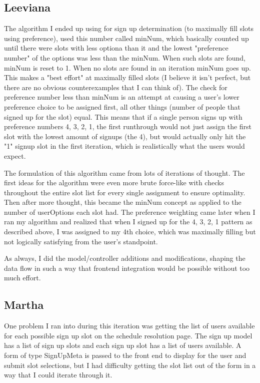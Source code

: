 \documentclass{article}
\begin{document}
\subsection{Leeviana}
The algorithm I ended up using for sign up determination (to maximally fill slots using preference), used this number called minNum, which basically counted up until there were slots with less optiona than it and the lowest "preference number" of the options was less than the minNum. When such slots are found, minNum is reset to 1. When no slots are found in an iteration minNum goes up. This makes a "best effort" at maximally filled slots (I believe it isn't perfect, but there are no obvious counterexamples that I can think of). The check for preference number less than minNum is an attempt at causing a user's lower preference choice to be assigned first, all other things (number of people that signed up for the slot) equal. This means that if a single person signs up with preference numbers 4, 3, 2, 1, the first runthrough would not just assign the first slot with the lowest amount of signups (the 4), but would actually only hit the "1" signup slot in the first iteration, which is realistically what the users would expect.

The formulation of this algorithm came from lots of iterations of thought. The first ideas for the algorithm were even more brute force-like with checks throughout the entire slot list for every single assignment to ensure optimality. Then after more thought, this became the minNum concept as applied to the number of userOptions each slot had. The preference weighting came later when I ran my algorithm and realized that when I signed up for the 4, 3, 2, 1 pattern as described above, I was assigned to my 4th choice, which was maximally filling but not logically satisfying from the user's standpoint.

As always, I did the model/controller additions and modifications, shaping the data flow in such a way that frontend integration would be possible without too much effort.

\subsection{Martha}
One problem I ran into during this iteration was getting the list of users available for each possible sign up slot on the schedule resolution page.  The sign up model has a list of sign up slots and each sign up slot has a list of users available.  A form of type SignUpMeta is passed to the front end to display for the user and submit slot selections, but I had difficulty getting the slot list out of the form in a way that I could iterate through it.
\end{document}
